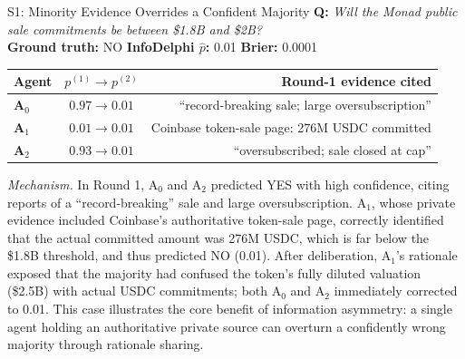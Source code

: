 \documentclass[11pt]{article}
\theoremstyle{plain}
\theoremstyle{definition}
\newcommand{\agA}[1]{\textcolor{agA}{\textbf{#1}}}
\newcommand{\agB}[1]{\textcolor{agB}{\textbf{#1}}}
\newcommand{\agC}[1]{\textcolor{agC}{\textbf{#1}}}
\begin{document}
\begin{successcase}{S1: Minority Evidence Overrides a Confident Majority}
\textbf{Q:} \textit{Will the Monad public sale commitments be between \$1.8B and \$2B?}\\[2pt]
\textbf{Ground truth:} NO \quad \textbf{InfoDelphi $\hat{p}$:} 0.01 \quad \textbf{Brier:} 0.0001

\smallskip
\setlength{\tabcolsep}{4pt}
\renewcommand{\arraystretch}{1.2}
\begin{tabularx}{\linewidth}{@{}l c R@{}}
\toprule
\textbf{Agent} & $p^{(1)}\!\to\!p^{(2)}$ & \textbf{Round-1 evidence cited} \\
\midrule
\agA{A$_0$} & $0.97 \to 0.01$ & ``record-breaking sale; large oversubscription'' \\
\agB{A$_1$} & $0.01 \to 0.01$ & Coinbase token-sale page: 276M USDC committed \\
\agC{A$_2$} & $0.93 \to 0.01$ & ``oversubscribed; sale closed at cap'' \\
\bottomrule
\end{tabularx}

\smallskip
\textit{Mechanism.} In Round 1, A$_0$ and A$_2$ predicted YES with high
confidence, citing reports of a ``record-breaking'' sale and large
oversubscription. A$_1$, whose private evidence included Coinbase's
authoritative token-sale page, correctly identified that the actual committed
amount was 276M USDC, which is far below the \$1.8B threshold, and thus
predicted NO (0.01). After deliberation, A$_1$'s rationale exposed that the
majority had confused the token's fully diluted valuation (\$2.5B) with actual
USDC commitments; both A$_0$ and A$_2$ immediately corrected to 0.01. This
case illustrates the core benefit of information asymmetry: a single agent
holding an authoritative private source can overturn a confidently wrong
majority through rationale sharing.
\end{successcase}
\end{document}
